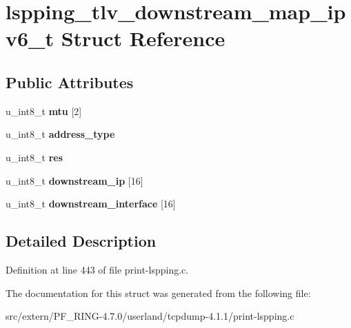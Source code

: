 \hypertarget{structlspping__tlv__downstream__map__ipv6__t}{
\section{lspping\_\-tlv\_\-downstream\_\-map\_\-ipv6\_\-t Struct Reference}
\label{structlspping__tlv__downstream__map__ipv6__t}
}
\subsection*{Public Attributes}
\begin{DoxyCompactItemize}
\item 
\hypertarget{structlspping__tlv__downstream__map__ipv6__t_ab7f5667e5ae948bb66bd77873cc8b1c9}{
u\_\-int8\_\-t {\bfseries mtu} \mbox{[}2\mbox{]}}
\label{structlspping__tlv__downstream__map__ipv6__t_ab7f5667e5ae948bb66bd77873cc8b1c9}

\item 
\hypertarget{structlspping__tlv__downstream__map__ipv6__t_ac829f8ac9cc14473195bfd00851a7fff}{
u\_\-int8\_\-t {\bfseries address\_\-type}}
\label{structlspping__tlv__downstream__map__ipv6__t_ac829f8ac9cc14473195bfd00851a7fff}

\item 
\hypertarget{structlspping__tlv__downstream__map__ipv6__t_a63782338595ba6378dd2138d0a4675af}{
u\_\-int8\_\-t {\bfseries res}}
\label{structlspping__tlv__downstream__map__ipv6__t_a63782338595ba6378dd2138d0a4675af}

\item 
\hypertarget{structlspping__tlv__downstream__map__ipv6__t_a290082e958644cbfe9922ae8b9628102}{
u\_\-int8\_\-t {\bfseries downstream\_\-ip} \mbox{[}16\mbox{]}}
\label{structlspping__tlv__downstream__map__ipv6__t_a290082e958644cbfe9922ae8b9628102}

\item 
\hypertarget{structlspping__tlv__downstream__map__ipv6__t_a19813f35493992f34f527595684d8b6b}{
u\_\-int8\_\-t {\bfseries downstream\_\-interface} \mbox{[}16\mbox{]}}
\label{structlspping__tlv__downstream__map__ipv6__t_a19813f35493992f34f527595684d8b6b}

\end{DoxyCompactItemize}


\subsection{Detailed Description}


Definition at line 443 of file print-\/lspping.c.



The documentation for this struct was generated from the following file:\begin{DoxyCompactItemize}
\item 
src/extern/PF\_\-RING-\/4.7.0/userland/tcpdump-\/4.1.1/print-\/lspping.c\end{DoxyCompactItemize}
